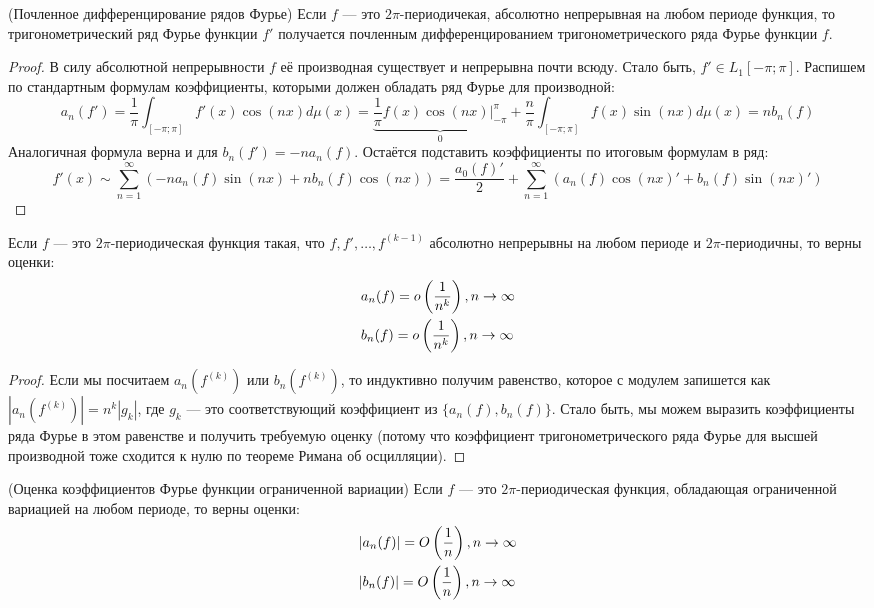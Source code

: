 \begin{theorem} (Почленное дифференцирование рядов Фурье) Если $f$ --- это $2\pi$-периодичекая, абсолютно непрерывная на любом периоде функция, то тригонометрический ряд Фурье функции $f'$ получается почленным дифференцированием тригонометрического ряда Фурье функции $f$.
\end{theorem}

\begin{proof}
	В силу абсолютной непрерывности $f$ её производная существует и непрерывна почти всюду. Стало быть, $f' \in L_1[-\pi; \pi]$. Распишем по стандартным формулам коэффициенты, которыми должен обладать ряд Фурье для производной:
	\[
		a_n(f') = \frac{1}{\pi} \int_{[-\pi; \pi]} f'(x)\cos(nx)d\mu(x) = \underbrace{\frac{1}{\pi} f(x)\cos(nx)\Big|_{-\pi}^\pi}_{0} + \frac{n}{\pi} \int_{[-\pi; \pi]} f(x)\sin(nx)d\mu(x) = nb_n(f)
	\]
	Аналогичная формула верна и для $b_n(f') = -na_n(f)$. Остаётся подставить коэффициенты по итоговым формулам в ряд:
	\[
		f'(x) \sim \sum_{n = 1}^\infty (-na_n(f)\sin(nx) + nb_n(f)\cos(nx)) = \frac{a_0(f)'}{2} + \sum_{n = 1}^\infty (a_n(f)\cos(nx)' + b_n(f)\sin(nx)')
	\]
\end{proof}

\begin{corollary}
	Если $f$ --- это $2\pi$-периодическая функция такая, что $f, f', \ldots, f^{(k - 1)}$ абсолютно непрерывны на любом периоде и $2\pi$-периодичны, то верны оценки:
	\begin{align*}
		&{a_n(f) = o\left(\frac{1}{n^k}\right), n \to \infty}
		\\
		&{b_n(f) = o\left(\frac{1}{n^k}\right), n \to \infty}
	\end{align*}
\end{corollary}

\begin{proof}
	Если мы посчитаем $a_n(f^{(k)})$ или $b_n(f^{(k)})$, то индуктивно получим равенство, которое с модулем запишется как \(|a_n(f^{(k)})| = n^k|g_k|\), где $g_k$ --- это соответствующий коэффициент из $\{a_n(f), b_n(f)\}$. Стало быть, мы можем выразить коэффициенты ряда Фурье в этом равенстве и получить требуемую оценку (потому что коэффициент тригонометрического ряда Фурье для высшей производной тоже сходится к нулю по теореме Римана об осцилляции).
\end{proof}

\begin{theorem} (Оценка коэффициентов Фурье функции ограниченной вариации)
	Если $f$ --- это $2\pi$-периодическая функция, обладающая ограниченной вариацией на любом периоде, то верны оценки:
	\begin{align*}
		&{|a_n(f)| = O\left(\frac{1}{n}\right), n \to \infty}
		\\
		&{|b_n(f)| = O\left(\frac{1}{n}\right), n \to \infty}
	\end{align*}
\end{theorem}

